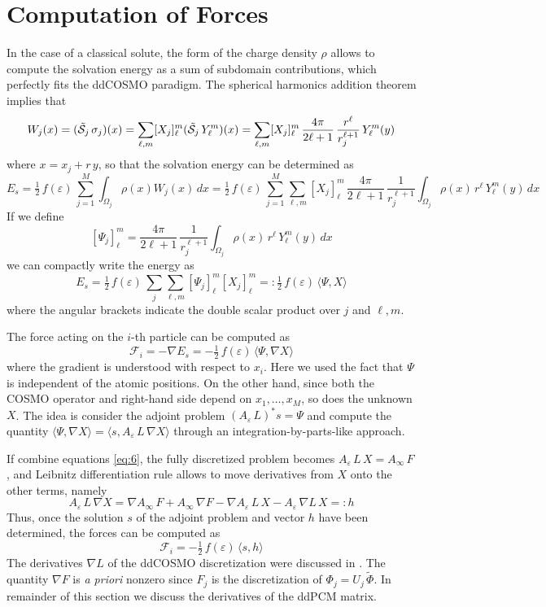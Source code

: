 \section{Computation of Forces}\label{sec:forces}
In the case of a classical solute, the form of the charge density $\rho$ allows to compute the solvation energy as a sum of subdomain contributions, which perfectly fits the ddCOSMO paradigm. The spherical harmonics addition theorem implies that
\[
W_j(x) = (\tilde{\mathcal{S}}_j \, \sigma_j)(x) = \sum_{\ell,m} [X_j]_\ell^m (\tilde{\mathcal{S}}_j \, Y_\ell^m)(x) = \sum_{\ell,m} [X_j]_\ell^m \, \frac{4\pi}{2\ell+1} \,\frac{r^\ell}{r_j^{\ell+1}} \, Y_\ell^m(y)
\]
where $x = x_j + r\, y$, so that the solvation energy can be determined as
\[
E_s = \tfrac{1}{2} \,f(\varepsilon) \, \sum_{j=1}^M \int_{\Omega_j} \rho(x) W_j(x) \, dx = \tfrac{1}{2}\, f(\varepsilon) \, \sum_{j=1}^M \sum_{\ell,m} [X_j]_\ell^m \, \frac{4\pi}{2\ell+1} \,\frac{1}{r_j^{\ell+1}} 
\int_{\Omega_j} \rho(x) \, r^\ell \, Y_\ell^m(y) \, dx
\]
If we define
\[
[\Psi_j]_\ell^m = \frac{4\pi}{2\ell+1}\, \frac{1}{r_j^{\ell+1}}\int_{\Omega_j} \rho(x) \, r^\ell \, Y_\ell^m(y) \, dx
\]
we can compactly write the energy as
\[
E_s = \tfrac{1}{2} \,f(\varepsilon) \, \sum_j \sum_{\ell,m} [\Psi_j]_\ell^m [X_j]_\ell^m =: \tfrac{1}{2} \,f(\varepsilon) \,\langle \Psi, X \rangle
\]
where the angular brackets indicate the double scalar product over $j$ and $\ell,m$.

The force acting on the $i$-th particle can be computed as
\[
\mathcal{F}_i = -\nabla E_s = - \tfrac{1}{2} \,f(\varepsilon) \,  \langle \Psi, \nabla X \rangle %
\]
where the gradient is understood with respect to $x_i$. Here we used the fact that $\Psi$ is independent of the atomic positions. On the other hand, since both the COSMO operator and right-hand side depend on $x_1 , \ldots, x_M$, so does the unknown $X$. The idea is consider the adjoint problem $(A_\varepsilon \, L)^* s = \Psi$ and compute the quantity $\langle \Psi, \nabla X \rangle = \langle s ,  A_\varepsilon \, L \, \nabla X\rangle$ through an integration-by-parts-like approach.

If combine equations \eqref{eq:6}, the fully discretized problem becomes $A_\varepsilon \, L \, X = A_\infty \, F$, and Leibnitz differentiation rule allows to move derivatives from $X$ onto the other terms, namely
\[
A_\varepsilon \, L \, \nabla X = \nabla A_\infty \, F +  A_\infty \, \nabla F - \nabla A_\varepsilon \, L \, X -  A_\varepsilon \, \nabla L \, X=: h
\]
Thus, once the solution $s$ of the adjoint problem and vector $h$ have been determined, the forces can be computed as
\[
\mathcal{F}_i =  - \tfrac{1}{2} \,f(\varepsilon) \,  \langle s, h \rangle
\]
The derivatives $\nabla L $ of the ddCOSMO discretization were discussed in \cite{}. The quantity $\nabla F$ is \emph{a priori} nonzero since $F_j$ is the discretization of $\Phi_j = U_j \, \tilde{\Phi}$. In remainder of this section we discuss the derivatives of the ddPCM matrix.

